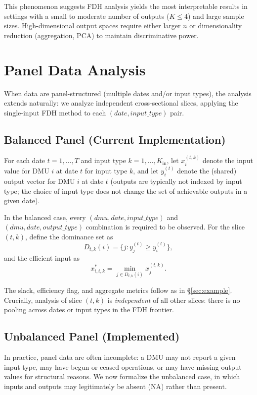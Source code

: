\documentclass[11pt]{article}
\theoremstyle{definition}
\theoremstyle{plain}
\theoremstyle{remark}
\begin{document}
This phenomenon suggests FDH analysis yields the most interpretable results in settings with a small to moderate number of outputs ($K \le 4$) and large sample sizes.
High-dimensional output spaces require either larger $n$ or dimensionality reduction (aggregation, PCA) to maintain discriminative power.

\section{Panel Data Analysis}

When data are panel-structured (multiple dates and/or input types), the analysis extends naturally:
we analyze independent cross-sectional slices, applying the single-input FDH method to each $(date, input\_type)$ pair.

\subsection{Balanced Panel (Current Implementation)}

For each date $t = 1, \ldots, T$ and input type $k = 1, \ldots, K_{\text{in}}$,
let $x_i^{(t,k)}$ denote the input value for DMU $i$ at date $t$ for input type $k$,
and let $y_i^{(t)}$ denote the (shared) output vector for DMU $i$ at date $t$
(outputs are typically not indexed by input type; the choice of input type does not change the set of achievable outputs in a given date).

In the balanced case, every $(dmu, date, input\_type)$ and $(dmu, date, output\_type)$ combination is required to be observed.
For the slice $(t, k)$, define the dominance set as
\[ D_{t,k}(i) = \{ j : y_j^{(t)} \ge y_i^{(t)} \}, \]
and the efficient input as
\[ x_{i,t,k}^{*} = \min_{j \in D_{t,k}(i)} x_j^{(t,k)}. \]

The slack, efficiency flag, and aggregate metrics follow as in \S\ref{sec:example}.
Crucially, analysis of slice $(t, k)$ is \emph{independent} of all other slices:
there is no pooling across dates or input types in the FDH frontier.

\subsection{Unbalanced Panel (Implemented)}

In practice, panel data are often incomplete: a DMU may not report a given input type, may have begun or ceased operations, or may have missing output values for structural reasons. We now formalize the unbalanced case, in which inputs and outputs may legitimately be absent (NA) rather than present.
\end{document}
